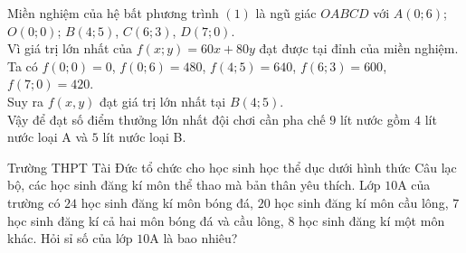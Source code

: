 \begin{ex}
\begin{ex}
{\begin{center}
		\end{center}
		Miền nghiệm của hệ bất phương trình $(1)$ là ngũ giác $OABCD$ với $A(0;6)$; $O(0;0)$; $B(4;5)$, $C(6;3)$, $D(7;0)$. \\
		Vì giá trị lớn nhất của $f(x;y)=60x+80y$ đạt được tại đỉnh của miền nghiệm.\\
		Ta có $f(0;0)=0$, $f(0;6)=480$, $f(4;5)=640$, $f(6;3)=600$, $f(7;0)=420$.\\
		Suy ra $f(x,y)$ đạt giá trị lớn nhất tại $B(4; 5)$.\\
		Vậy để đạt số điểm thưởng lớn nhất đội chơi cần pha chế $9$ lít nước gồm $4$ lít nước loại A và $5$ lít nước loại B. 
	}
\end{ex}

\begin{ex}%
Trường THPT Tài Đức tổ chức cho học sinh học thể dục dưới hình thức Câu lạc bộ, các học sinh đăng kí môn thể thao mà bản thân yêu thích. Lớp $10$A của trường có $24$ học sinh đăng kí môn bóng đá, $20$ học sinh đăng kí môn cầu lông, $7$ học sinh đăng kí cả hai môn bóng đá và cầu lông, $8$ học sinh đăng kí một môn khác. Hỏi sỉ số của lớp $10$A là bao nhiêu?
\end{ex}



\end{ex}
